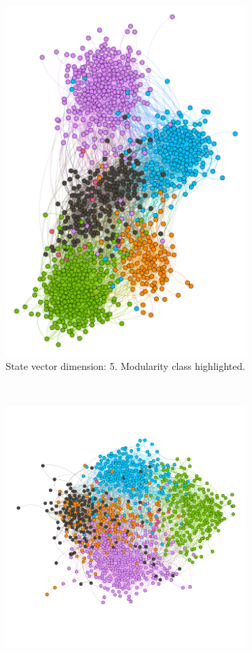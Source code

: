 \begin{figure}
\begin{subfigure}[t]{0.35\textwidth}
    \includegraphics[width=\textwidth]{img/dim5_mod.pdf}
    \caption{State vector dimension: 5.
      Modularity class highlighted.}
    \label{fig:bubble5mod}
  \end{subfigure}
  ~
  \begin{subfigure}[t]{0.35\textwidth}
    \includegraphics[width=\textwidth]{img/dim7_mod.pdf}

\end{subfigure}
\end{figure}
